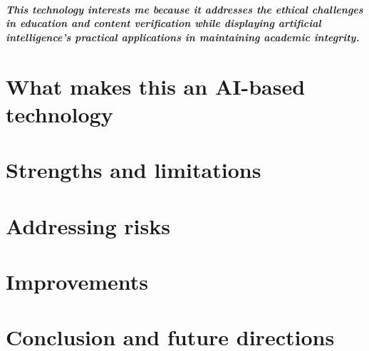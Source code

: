 \documentclass[11pt,letterpaper,final]{report}
\begin{document}
\paragraph{
This technology interests me because it addresses the ethical challenges in education and content verification while displaying artificial intelligence's practical applications in maintaining academic integrity. 
}
\chapter{What makes this an AI-based technology}

\chapter{Strengths and limitations}

\chapter{Addressing risks}

\chapter{Improvements}

\chapter{Conclusion and future directions}
\printbibliography
\end{document}
